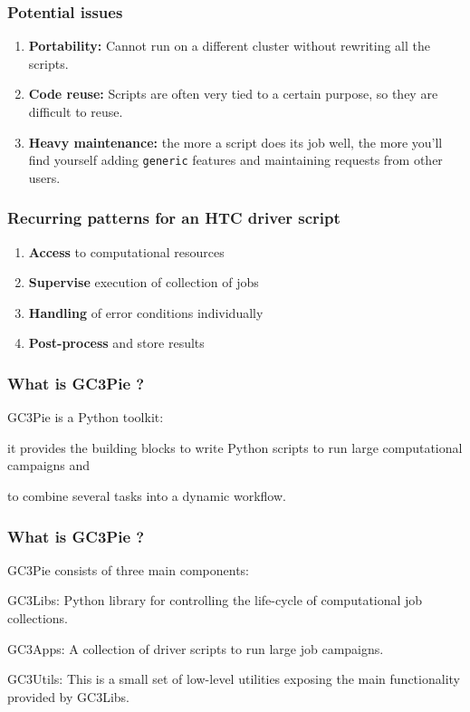 \documentclass[english,serif,mathserif,xcolor=pdftex,dvipsnames,table]{beamer}
\begin{document}
\begin{frame}
  \frametitle{Potential issues}
  \begin{enumerate}
  \item \textbf{Portability:} Cannot run on a different cluster without
    rewriting all the scripts.
  \item \textbf{Code reuse:} Scripts are often very tied to a certain purpose, so
    they are difficult to reuse.
  \item \textbf{Heavy maintenance:} the more a script does its job well, the more
    you'll find yourself adding \texttt{generic} features and maintaining
    requests from other users.
  \end{enumerate}
\end{frame}

\begin{frame}
  \frametitle{Recurring patterns for an HTC driver script}
  \begin{enumerate}
  \item{\textbf{Access}} to computational resources
  \item{\textbf{Supervise}} execution of collection of jobs
  \item{\textbf{Handling}} of error conditions individually
  \item{\textbf{Post-process}} and store results
  \end{enumerate}
\end{frame}

\begin{frame}
\frametitle{What is GC3Pie ?}
  \begin{block}{}
    GC3Pie is a {\color{Blue} Python} toolkit:
  \end{block}

  \begin{block}{}
    it provides the building blocks to write Python scripts to run large {\color{Blue} computational campaigns} and
  \end{block}

  \begin{block}{}
    to {\color{Blue} combine} several tasks into a dynamic
    {\color{Blue} workflow}.
  \end{block}
\end{frame}

\begin{frame}
\frametitle{What is GC3Pie ?}

  GC3Pie consists of three main components:

  \begin{block}{GC3Libs:} Python library for controlling the life-cycle of computational job collections. \end{block}
  \begin{block}{GC3Apps:} A collection of driver scripts to run large job campaigns. \end{block}
  \begin{block}{GC3Utils:} This is a small set of low-level utilities exposing the main functionality provided by GC3Libs. \end{block}
\end{frame}
\end{document}
